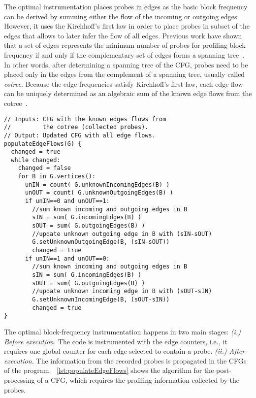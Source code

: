 The optimal instrumentation places probes in edges as the basic block frequency can be derived by summing either the flow of the incoming or outgoing edges.
However, it uses the Kirchhoff's first law in order to place probes in subset of the edges that allows to later infer the flow of all edges.
Previous work have shown that a set of edges represents the minimum number of probes for profiling block frequency if and only if the complementary set of edges forms a spanning tree~\citep{nahapetian73,ball94}.
In other words, after determining a spanning tree of the CFG, probes need to be placed only in the edges from the complement of a spanning tree, usually called \textit{cotree}.
Because the edge frequencies satisfy Kirchhoff's first law, each edge flow can be uniquely determined as an algebraic sum of the known edge flows from the cotree~\citep{nahapetian73,ball94}.

\begin{lstlisting}[caption={Post-processing of the CFG for populating all edge flows based on the collected probes.}, label={lst:populateEdgeFlows}]
// Inputs: CFG with the known edges flows from
//         the cotree (collected probes).
// Output: Updated CFG with all edge flows.
populateEdgeFlows(G) {
  changed = true
  while changed:
    changed = false
    for B in G.vertices():
      unIN = count( G.unknownIncomingEdges(B) )
      unOUT = count( G.unknownOutgoingEdges(B) )
      if unIN==0 and unOUT==1:
        //sum known incoming and outgoing edges in B
        sIN = sum( G.incomingEdges(B) )
        sOUT = sum( G.outgoingEdges(B) )
        //update unknown outgoing edge in B with (sIN-sOUT)
        G.setUnknownOutgoingEdge(B, (sIN-sOUT))
        changed = true
      if unIN==1 and unOUT==0:
        //sum known incoming and outgoing edges in B
        sIN = sum( G.incomingEdges(B) )
        sOUT = sum( G.outgoingEdges(B) )
        //update unknown incoming edge in B with (sOUT-sIN)
        G.setUnknownIncomingEdge(B, (sOUT-sIN))
        changed = true
}
\end{lstlisting}

The optimal block-frequency instrumentation happens in two main stages:
\textit{(i.) Before execution.} The code is instrumented with the edge counters, i.e., it requires one global counter for each edge selected to contain a probe.
\textit{(ii.) After execution.} The information from the recorded probes is propagated in the CFGs of the program.
\lstlistingname~\ref{lst:populateEdgeFlows} shows the algorithm for the post-processing of a CFG, which requires the profiling information collected by the probes.

